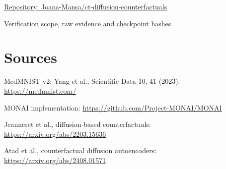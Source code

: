 \documentclass[11pt,a4paper]{article}
\begin{document}
\href{https://github.com/Joana-Mansa/ct-diffusion-counterfactuals}{Repository: Joana-Mansa/ct-diffusion-counterfactuals}\par
\href{https://github.com/Joana-Mansa/ct-diffusion-counterfactuals/blob/main/docs/verification.md}{Verification scope, raw evidence and checkpoint hashes}

\section*{Sources}
{\small
MedMNIST v2: Yang et al., Scientific Data 10, 41 (2023). \url{https://medmnist.com/}\par
MONAI implementation: \url{https://github.com/Project-MONAI/MONAI}\par
Jeanneret et al., diffusion-based counterfactuals: \url{https://arxiv.org/abs/2203.15636}\par
Atad et al., counterfactual diffusion autoencoders: \url{https://arxiv.org/abs/2408.01571}
}
\end{document}
